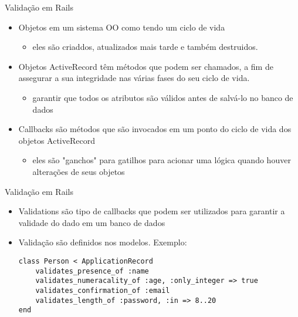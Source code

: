 \begin{frame}{Validação em Rails}
	\begin{itemize}
		\item \alert{Objetos} em um sistema OO como tendo um \alert{ciclo de vida}
		\begin{itemize}
			\item eles são criaddos, atualizados mais tarde e também destruidos.
		\end{itemize}
				
		\item Objetos ActiveRecord têm \alert{métodos} que podem ser chamados, a fim de
		assegurar a sua \alert{integridade} nas várias fases do seu ciclo de vida.
		\begin{itemize}
			\item garantir que todos os atributos são \alert{válidos} antes de salvá-lo no
				banco de dados
		\end{itemize}
		
		\item \alert{Callbacks} são métodos que são invocados em um ponto do ciclo 
			de vida dos objetos ActiveRecord
		\begin{itemize}
			\item eles são "ganchos" para gatilhos para acionar uma lógica quando houver
			alterações de seus objetos
		\end{itemize}
	\end{itemize}
\end{frame}
\begin{frame}[t, fragile]{Validação em Rails}
	\begin{itemize}
		\item \alert{Validations} são tipo de \alert{callbacks} que podem ser utilizados 
			para garantir a validade do dado em um banco de dados 
		
		\item Validação são definidos nos \alert{modelos}. Exemplo:
		\begin{lstlisting}[style=RubyInputStyle]
class Person < ApplicationRecord 
    validates_presence_of :name
    validates_numeracality_of :age, :only_integer => true 
    validates_confirmation_of :email
    validates_length_of :password, :in => 8..20	
end 
		\end{lstlisting}			
		
	\end{itemize}
\end{frame}